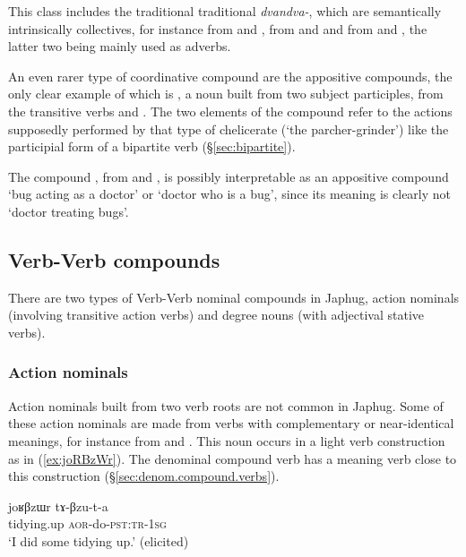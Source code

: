 This class includes the traditional traditional \textit{dvandva-}, which are semantically intrinsically collectives, for instance  from  and ,  from  and  and  from  and , the latter two being mainly used as adverbs.

An even rarer type of coordinative compound are the appositive compounds, the only clear example of which is , a noun built from two subject participles, from the transitive verbs  and  . The two elements of the compound refer to the actions supposedly performed by that type of chelicerate (`the parcher-grinder') like the participial form of a bipartite verb (§\ref{sec:bipartite}).

The compound , from   and  , is possibly interpretable as an appositive compound  `bug acting as a doctor' or `doctor who is a bug', since its meaning is clearly not `doctor treating bugs'.

\subsection{Verb-Verb compounds} \label{sec.v.v.compounds}
There are two types of Verb-Verb nominal compounds in Japhug, action nominals (involving transitive action verbs) and degree nouns (with adjectival stative verbs).

\subsubsection{Action nominals} \label{sec.v.v.compounds.action}
Action nominals built from two verb roots are not common in Japhug. Some of these action nominals are made from verbs with complementary or near-identical meanings, for instance  from  and . This noun occurs in a light verb construction as in (\ref{ex:joRBzWr}). The denominal compound verb   has a meaning verb close to this construction (§\ref{sec:denom.compound.verbs}).

\begin{exe}
\ex \label{ex:joRBzWr}
 \gll joʁβzɯr tɤ-βzu-t-a \\
 tidying.up \textsc{aor}-do-\textsc{pst}:\textsc{tr}-\textsc{1sg} \\
 \glt `I did some tidying up.' (elicited)
\end{exe}


